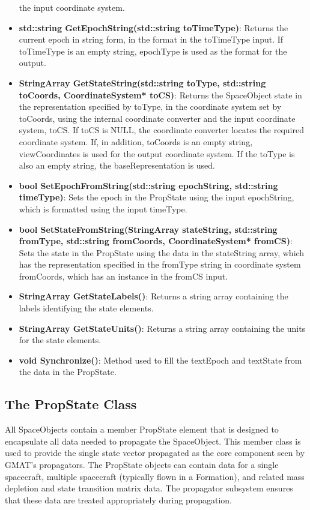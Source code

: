 \begin{itemize}
the input coordinate system.
\item \textbf{std::string GetEpochString(std::string toTimeType)}:  Returns the current epoch in
string form, in the format in the toTimeType input.  If toTimeType is an empty string, epochType is
used as the format for the output.
\item \textbf{StringArray GetStateString(std::string toType, std::string toCoords, CoordinateSystem*
toCS)}:  Returns the SpaceObject state in the representation specified by toType, in the coordinate
system set by toCoords, using the internal coordinate converter and the input coordinate system,
toCS.  If toCS is NULL, the coordinate converter locates the required coordinate system.  If, in
addition, toCoords is an empty string, viewCoordinates is used for the output coordinate system.  If
the toType is also an empty string, the baseRepresentation is used.
\item \textbf{bool SetEpochFromString(std::string epochString, std::string timeType)}:  Sets the
epoch in the PropState using the input epochString, which is formatted using the input timeType.
\item \textbf{bool SetStateFromString(StringArray stateString, std::string fromType, std::string
fromCoords, CoordinateSystem* fromCS)}:  Sets the state in the PropState using the data in the
stateString array, which has the representation specified in the fromType string in coordinate
system fromCoords, which has an instance in the fromCS input.
\item \textbf{StringArray GetStateLabels()}:  Returns a string array containing the labels
identifying the state elements.
\item \textbf{StringArray GetStateUnits()}:  Returns a string array containing the units for the
state elements.
\item \textbf{void Synchronize()}:  Method used to fill the textEpoch and textState from the data in
the PropState.
\end{itemize}

\subsection{\label{section:PropState}The PropState Class}

All SpaceObjects contain a member PropState element that is designed to encapsulate all data needed
to propagate the SpaceObject.  This member class is used to provide the single state vector
propagated as the core component seen by GMAT's propagators.  The PropState objects can contain data
for a single spacecraft, multiple spacecraft (typically flown in a Formation), and related mass
depletion and state transition matrix data.  The propagator subsystem ensures that these data are
treated appropriately during propagation.

